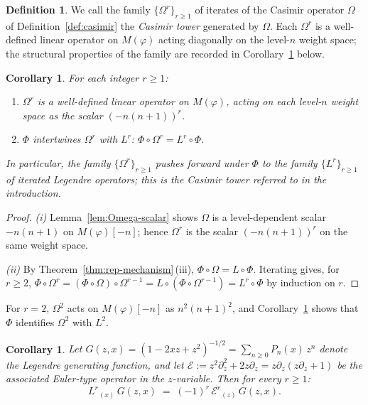\documentclass[12pt]{amsart}
\theoremstyle{plain}
\newtheorem{corollary}[theorem]{Corollary}
\theoremstyle{definition}
\newtheorem{definition}[theorem]{Definition}
\newcommand{\Mf}{M(\varphi)}          %
\newcommand{\Om}{\Omega}              %
\begin{document}
\begin{definition}
\label{def:casimir-tower}
We call the family $\{\Om^r\}_{r\geq 1}$ of iterates of the
Casimir operator $\Om$ of
Definition~\ref{def:casimir} the \emph{Casimir tower} generated by
$\Om$.  Each $\Om^r$ is a well-defined linear operator on $\Mf$ acting
diagonally on the level-$n$ weight space; the structural properties
of the family are recorded in Corollary~\ref{cor:casimir-tower} below.
\end{definition}

\begin{corollary}
\label{cor:casimir-tower}
For each integer $r\geq 1$:
\begin{enumerate}[label=\textup{(\roman*)}]
  \item $\Om^r$ is a well-defined linear operator on $\Mf$, acting on each
        level-$n$ weight space as the scalar $(-n(n+1))^r$.
  \item $\Phi$ intertwines $\Om^r$ with $L^r$:
        $\Phi\circ\Om^r = L^r\circ\Phi$.
\end{enumerate}
In particular, the family $\{\Om^r\}_{r\geq 1}$ pushes forward under
$\Phi$ to the family $\{L^r\}_{r\geq 1}$ of iterated Legendre operators;
this is the Casimir tower referred to in the introduction.
\end{corollary}

\begin{proof}
\emph{(i)} Lemma~\ref{lem:Omega-scalar} shows $\Om$ is a level-dependent
scalar $-n(n+1)$ on $\Mf[-n]$; hence $\Om^r$ is the scalar $(-n(n+1))^r$
on the same weight space.

\emph{(ii)} By Theorem~\ref{thm:rep-mechanism}\,(iii), $\Phi\circ\Om =
L\circ\Phi$. Iterating gives, for $r\geq 2$,
$\Phi\circ\Om^r = (\Phi\circ\Om)\circ\Om^{r-1} =
L\circ(\Phi\circ\Om^{r-1}) = L^r\circ\Phi$ by induction on $r$.
\end{proof}

For $r=2$, $\Om^2$ acts on $\Mf[-n]$ as $n^2(n+1)^2$, and
Corollary~\ref{cor:casimir-tower} shows that $\Phi$ identifies $\Om^2$
with $L^2$.

\begin{corollary}
\label{cor:genfun-intertwine}
Let $G(z,x) = (1-2xz+z^2)^{-1/2} = \sum_{n\geq 0} P_n(x)\,z^n$ denote
the Legendre generating function, and let $\mathcal{E} := z^2\partial_z^2
+ 2z\partial_z = z\partial_z(z\partial_z+1)$ be the associated Euler-type
operator in the $z$-variable. Then for every $r\geq 1$:
\begin{equation}\label{eq:genfun-intertwine}
  L^r{}_{(x)}\,G(z,x) \;=\; (-1)^r\,\mathcal{E}^r{}_{(z)}\,G(z,x).
\end{equation}
\end{corollary}
\end{document}
